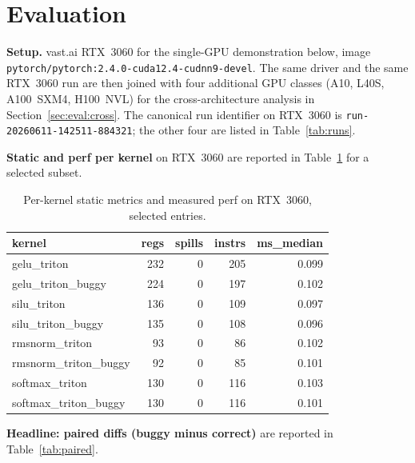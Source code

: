 \documentclass[runningheads]{llncs}
\begin{document}
\section{Evaluation}
\label{sec:eval}

\textbf{Setup.} vast.ai RTX~3060 for the single-GPU demonstration
below, image \texttt{pytorch/pytorch:2.4.0-cuda12.4-cudnn9-devel}.
The same driver and the same RTX~3060 run are then joined with four
additional GPU classes (A10, L40S, A100~SXM4, H100~NVL) for the
cross-architecture analysis in Section~\ref{sec:eval:cross}. The
canonical run identifier on RTX~3060 is
\texttt{run-20260611-142511-884321}; the other four are listed in
Table~\ref{tab:runs}.

\textbf{Static and perf per kernel} on RTX~3060 are reported in
Table~\ref{tab:perkernel} for a selected subset.

\begin{table}[h]
\centering
\caption{Per-kernel static metrics and measured perf on RTX~3060,
selected entries.}
\label{tab:perkernel}
\begin{tabular}{lrrrr}
\toprule
kernel & regs & spills & instrs & ms\_median \\
\midrule
gelu\_triton           & 232 & 0 & 205 & 0.099 \\
gelu\_triton\_buggy    & 224 & 0 & 197 & 0.102 \\
silu\_triton           & 136 & 0 & 109 & 0.097 \\
silu\_triton\_buggy    & 135 & 0 & 108 & 0.096 \\
rmsnorm\_triton        &  93 & 0 &  86 & 0.102 \\
rmsnorm\_triton\_buggy &  92 & 0 &  85 & 0.101 \\
softmax\_triton        & 130 & 0 & 116 & 0.103 \\
softmax\_triton\_buggy & 130 & 0 & 116 & 0.101 \\
\bottomrule
\end{tabular}
\end{table}

\textbf{Headline: paired diffs (buggy minus correct)}
are reported in Table~\ref{tab:paired}.
\end{document}
